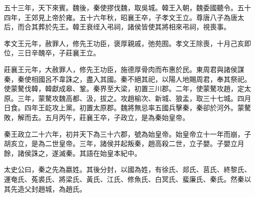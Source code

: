 五十三年，天下來賓。魏後，秦使摎伐魏，取吳城。韓王入朝，魏委國聽令。五十四年，王郊見上帝於雍。五十六年秋，昭襄王卒，子孝文王立。尊唐八子為唐太后，而合其葬於先王。韓王衰绖入弔祠，諸侯皆使其將相來弔祠，視喪事。

孝文王元年，赦罪人，修先王功臣，褒厚親戚，弛苑囿。孝文王除喪，十月己亥即位，三日辛醜卒，子莊襄王立。

莊襄王元年，大赦罪人，修先王功臣，施德厚骨肉而布惠於民。東周君與諸侯謀秦，秦使相國呂不韋誅之，盡入其國。秦不絕其祀，以陽人地賜周君，奉其祭祀。使蒙驁伐韓，韓獻成皋、鞏。秦界至大梁，初置三川郡。二年，使蒙驁攻趙，定太原。三年，蒙驁攻魏高都、汲，拔之。攻趙榆次、新城、狼孟，取三十七城。四月日食。四年王龁攻上黨。初置太原郡。魏將無忌率五國兵擊秦，秦卻於河外。蒙驁敗，解而去。五月丙午，莊襄王卒，子政立，是為秦始皇帝。

秦王政立二十六年，初并天下為三十六郡，號為始皇帝。始皇帝立十一年而崩，子胡亥立，是為二世皇帝。三年，諸侯并起叛秦，趙高殺二世，立子嬰。子嬰立月餘，諸侯誅之，遂滅秦。其語在始皇本紀中。

太史公曰，秦之先為嬴姓。其後分封，以國為姓，有徐氏、郯氏、莒氏、終黎氏、運奄氏、菟裘氏、將梁氏、黃氏、江氏、修魚氏、白冥氏、蜚廉氏、秦氏。然秦以其先造父封趙城，為趙氏。